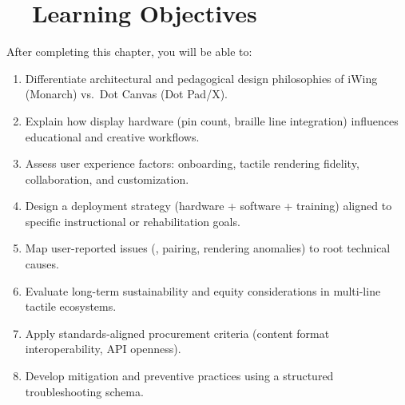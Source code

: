 \section{~~Learning Objectives}
\label{sec:sr29-learning-objectives}
After completing this chapter, you will be able to:
\begin{enumerate}
	\item Differentiate architectural and pedagogical design philosophies of iWing (Monarch) vs.\ Dot Canvas (Dot Pad/X).
	\item Explain how display hardware (pin count, braille line integration) influences educational and creative workflows.
	\item Assess user experience factors: onboarding, tactile rendering fidelity, collaboration, and customization.
	\item Design a deployment strategy (hardware + software + training) aligned to specific instructional or rehabilitation goals.
	\item Map user-reported issues (, pairing, rendering anomalies) to root technical causes.
	\item Evaluate long-term sustainability and equity considerations in multi-line tactile ecosystems.
	\item Apply standards-aligned procurement criteria (content format interoperability, API openness).
	\item Develop mitigation and preventive practices using a structured troubleshooting schema.
\end{enumerate}

